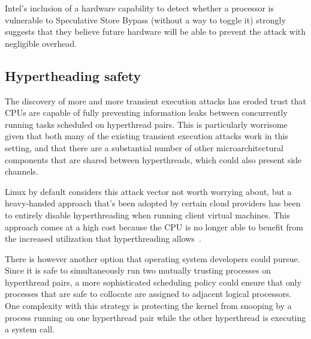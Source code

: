 Intel's inclusion of a hardware capability to detect whether a
processor is vulnerable to Speculative Store Bypass (without a way to toggle it) strongly
suggests that they believe future hardware will be able to prevent
the attack with negligible overhead.

\subsection{Hypertheading safety}

The discovery of more and more transient execution attacks has eroded trust that CPUs are capable of fully preventing information leaks between concurrently running tasks scheduled on hyperthread pairs.
This is particularly worrisome given that both many of the existing transient execution attacks work in this setting, and that there are a substantial number of other microarchitectural components that are shared between hyperthreads, which could also present side channels.

Linux by default considers this attack vector not worth worrying about, but a heavy-handed approach that's been adopted by certain cloud providers has been to entirely disable hyperthreading when running client virtual machines.
This approach comes at a high cost because the CPU is no longer able to benefit
from the increased utilization that hyperthreading allows~\cite{intelht}.

There is however another option that operating system developers could pursue.
Since it is safe to simultaneously run two mutually trusting processes
on hyperthread pairs, a more sophisticated scheduling policy could
ensure that only processes that are safe to collocate
are assigned to adjacent logical processors.
One complexity with this strategy is protecting the kernel from snooping by a process running on one hyperthread pair while the other hyperthread is executing a system call.
